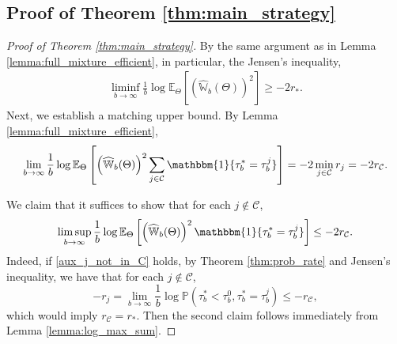 \documentclass[aap,preprint]{imsart}
\newcommand{\Pro}{{\mathbb{P}}}
\newcommand{\Exp}{{\mathbb{E}}}
\theoremstyle{plain}
\theoremstyle{definition}
\begin{document}
\begin{appendix}
\subsection{Proof of Theorem \ref{thm:main_strategy}}\label{app:proof_main_strategy}
\begin{proof}[Proof of Theorem \ref{thm:main_strategy}]
By the same argument as in Lemma \ref{lemma:full_mixture_efficient}, in particular, the Jensen's inequality,
\begin{align*}
      \liminf_{b\to \infty} \frac{1}{b} \log \Exp_{\Theta}\left[ \left(\widehat{\mathbb{W}}_{b}(\Theta) \right)^2  \right] \geq -2 r_*.
\end{align*}
Next, we establish a matching upper bound.
By Lemma \ref{lemma:full_mixture_efficient},
\begin{align*}
        \lim_{b\to \infty} \frac{1}{b} \log  \Exp_{\Theta}\left[ \left(\widehat{\mathbb{W}}_{b}(\Theta) \right)^2 \sum_{j \in \mathcal{C}} \mathbbm{1}\{\tau_b^* = \tau_b^j\}\right] = -2 \min_{j \in \mathcal{C}} r_j = -2 r_\mathcal{C}.
\end{align*}

 We claim that it suffices to show that for each $j \not \in \mathcal{C}$,
\begin{align}\label{aux_j_not_in_C}
        \limsup_{b\to \infty} \frac{1}{b} \log  \Exp_{\Theta}\left[ \left(\widehat{\mathbb{W}}_{b}(\Theta) \right)^2 \mathbbm{1}\{\tau_b^* = \tau_b^j\}\right]  \leq -2 r_\mathcal{C}.
\end{align}
Indeed, if \eqref{aux_j_not_in_C} holds, by Theorem \ref{thm:prob_rate} and Jensen's inequality, we have that for each $j \not \in \mathcal{C}$,
$$-r_{j} = \lim_{b \to \infty} \frac{1}{b} \log\Pro\left(\tau_b^* < \tau_b^0, \tau_b^* = \tau_b^j \right) \leq -r_{\mathcal{C}},
$$
which would imply $r_{\mathcal{C}}  = r_{*}$. Then the second claim follows immediately from Lemma \ref{lemma:log_max_sum}.



\end{proof}
\end{appendix}
\end{document}
